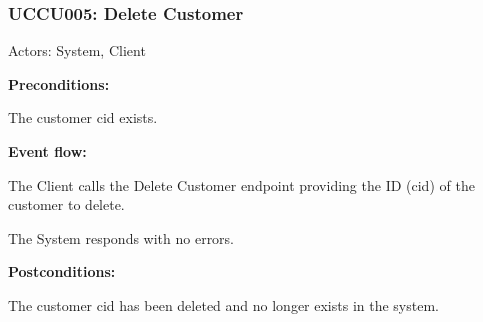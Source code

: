 \begin{ucbox}{\subsubsection{UCCU005: Delete Customer}}
\label{UCCU005}

Actors: System, Client

\textbf{Preconditions:}

\ucitem The customer cid exists.

\textbf{Event flow:}

\ucitem The Client calls the Delete Customer endpoint providing the ID (cid) of the customer to delete.

\ucitem The System responds with no errors.

\textbf{Postconditions:}

\ucitem The customer cid has been deleted and no longer exists in the system.

\end{ucbox}
\newpage
